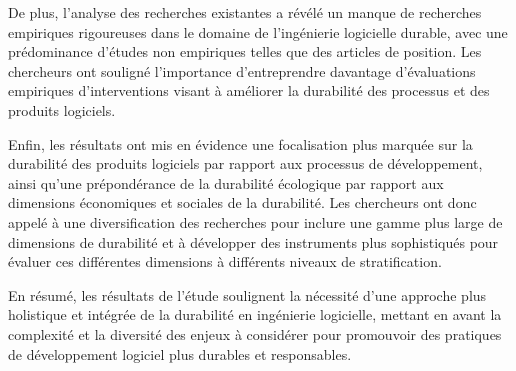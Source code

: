 De plus, l'analyse des recherches existantes a révélé un manque de recherches empiriques rigoureuses dans le domaine de l'ingénierie logicielle durable, avec une prédominance d'études non empiriques telles que des articles de position. Les chercheurs ont souligné l'importance d'entreprendre davantage d'évaluations empiriques d'interventions visant à améliorer la durabilité des processus et des produits logiciels.

Enfin, les résultats ont mis en évidence une focalisation plus marquée sur la durabilité des produits logiciels par rapport aux processus de développement, ainsi qu'une prépondérance de la durabilité écologique par rapport aux dimensions économiques et sociales de la durabilité. Les chercheurs ont donc appelé à une diversification des recherches pour inclure une gamme plus large de dimensions de durabilité et à développer des instruments plus sophistiqués pour évaluer ces différentes dimensions à différents niveaux de stratification.

En résumé, les résultats de l'étude soulignent la nécessité d'une approche plus holistique et intégrée de la durabilité en ingénierie logicielle, mettant en avant la complexité et la diversité des enjeux à considérer pour promouvoir des pratiques de développement logiciel plus durables et responsables.